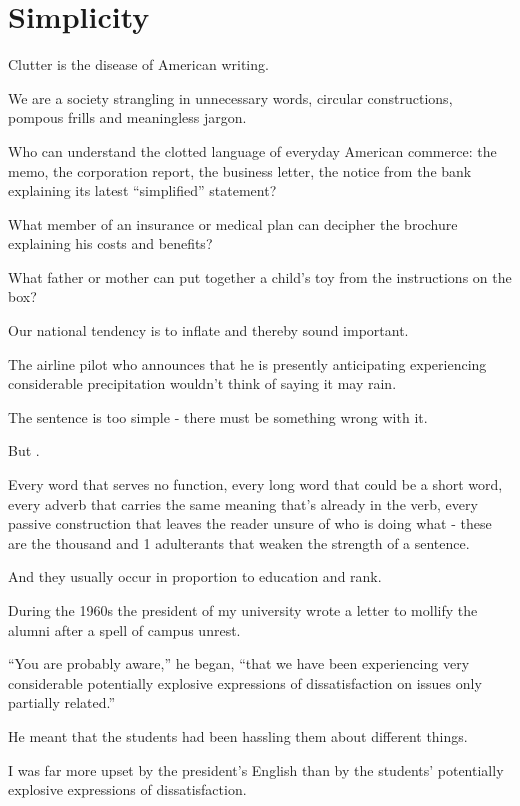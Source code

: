 \documentclass{book}
\numberwithin{equation}{section}
\begin{document}

\chapter{Simplicity}

Clutter is the disease of American writing.

We are a society strangling in unnecessary words, circular constructions, pompous frills and meaningless jargon.

%
Who can understand the clotted language of everyday American commerce: the memo, the corporation report, the business letter, the notice from the bank explaining its latest ``simplified'' statement?

What member of an insurance or medical plan can decipher the brochure explaining his costs and benefits?

What father or mother can put together a child's toy from the instructions on the box?

Our national tendency is to inflate and thereby sound important.

The airline pilot who announces that he is presently anticipating experiencing considerable precipitation wouldn't think of saying it may rain.

The sentence is too simple - there must be something wrong with it.

But .

Every word that serves no function, every long word that could be a short word, every adverb that carries the same meaning that's already in the verb, every passive construction that leaves the reader unsure of who is doing what - these are the thousand and 1 adulterants that weaken the strength of a sentence.

And they usually occur in proportion to education and rank.

%
During the 1960s the president of my university wrote a letter to mollify the alumni after a spell of campus unrest.

``You are probably aware,'' he began, ``that we have been experiencing very considerable potentially explosive expressions of dissatisfaction on issues only partially related.''

He meant that the students had been hassling them about different things.

I was far more upset by the president's English than by the students' potentially explosive expressions of dissatisfaction.
\end{document}
